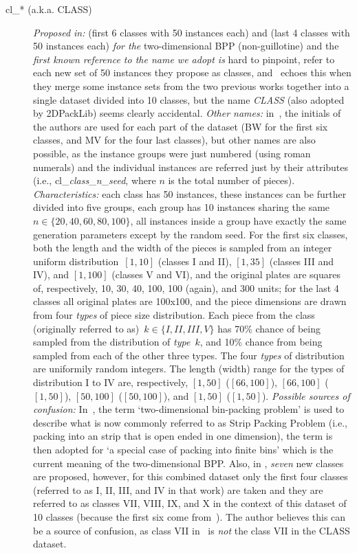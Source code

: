 \documentclass[ppgc,tese,english,formais,babel]{iiufrgs}
\begin{document}
\begin{description}
\item[cl\_* (a.k.a. CLASS)] \emph{Proposed in:} \citet{berkey:1987} (first 6 classes with 50 instances each) and \citet{martello:1998} (last 4 classes with 50 instances each) \emph{for the} two-dimensional BPP (non-guillotine) and the \emph{first known reference to the name we adopt is} hard to pinpoint, \citet{martello:1998} refer to each new set of 50 instances they propose as classes, and~\citet{boschetti:2003} echoes this when they merge some instance sets from the two previous works together into a single dataset divided into 10 classes, but the name \emph{CLASS} (also adopted by 2DPackLib) seems clearly accidental. \emph{Other names:} in~\cite{alvelos:2009}, the initials of the authors are used for each part of the dataset (BW for the first six classes, and MV for the four last classes), but other names are also possible, as the instance groups were just numbered (using roman numerals) and the individual instances are referred just by their attributes (i.e., cl\_\emph{class}\_\emph{n}\_\emph{seed}, where \(n\) is the total number of pieces). \emph{Characteristics:} each class has 50 instances, these instances can be further divided into five groups, each group has 10 instances sharing the same~\(n \in \{20, 40, 60, 80, 100\}\), all instances inside a group have exactly the same generation parameters except by the random seed. For the first six classes, both the length and the width of the pieces is sampled from an integer uniform distribution~\([1, 10]\) (classes I and II), \([1, 35]\) (classes III and IV), and \([1, 100]\) (classes V and VI), and the original plates are squares of, respectively, 10, 30, 40, 100, 100 (again), and 300 units; for the last 4 classes all original plates are 100x100, and the piece dimensions are drawn from four \emph{types} of piece size distribution. Each piece from the class (originally referred to as)~\(k \in \{I, II, III, V\}\) has 70\% chance of being sampled from the distribution of \emph{type}~\(k\), and 10\% chance from being sampled from each of the other three types. The four \emph{types} of distribution are uniformily random integers. The length (width) range for the types of distribution I to IV are, respectively, \([1, 50]\) (\([66, 100]\)), \([66, 100]\) (\([1, 50]\)), \([50, 100]\) (\([50, 100]\)), and \([1, 50]\) (\([1, 50]\)). \emph{Possible sources of confusion:} In~\citet{berkey:1987}, the term `two-dimensional bin-packing problem' is used to describe what is now commonly referred to as Strip Packing Problem (i.e., packing into an strip that is open ended in one dimension), the term is then adopted for `a special case of packing into finite bins' which is the current meaning of the two-dimensional BPP. Also, in \citet{martello:1998}, \emph{seven} new classes are proposed, however, for this combined dataset only the first four classes (referred to as I, II, III, and IV in that work) are taken and they are referred to as classes VII, VIII, IX, and X in the context of this dataset of 10 classes (because the first six come from~\citet{berkey:1987}). The author believes this can be a source of confusion, as class VII in~\citet{martello1998} is \emph{not} the class VII in the CLASS dataset.

\end{description}
\end{document}
